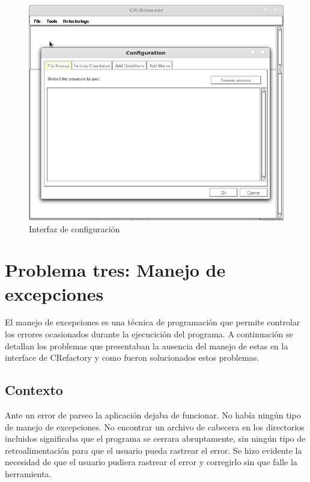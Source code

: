 \documentclass[a4paper,oneside,12pt]{article}
\begin{document}
\begin{figure}[h!]
  \centering
    \includegraphics[scale=0.45]{images/codigo_modificado/configuracion.jpg}
     \caption{Interfaz de configuraci\'on}
     \label{configuracion}
\end{figure}

\section{Problema tres: Manejo de excepciones}

El manejo de excepciones es una t\'ecnica de programaci\'on que permite controlar los errores ocasionados durante la ejecucici\'on del programa.
A continuaci\'on se detallan los problemas que presentaban la ausencia del manejo de estas en la interface de CRefactory y como fueron solucionados estos problemas.

\subsection{Contexto}
Ante un error de parseo la aplicaci\'on dejaba de funcionar. No hab\'ia ning\'un tipo de manejo de excepciones. No encontrar un archivo de cabecera en los directorios incluidos significaba que el programa se cerrara abruptamente, sin ning\'un tipo de retroalimentaci\'on para que el usuario pueda rastrear el error. Se hizo evidente la necesidad de que el usuario pudiera rastrear el error y corregirlo sin que falle la herramienta.
\end{document}
